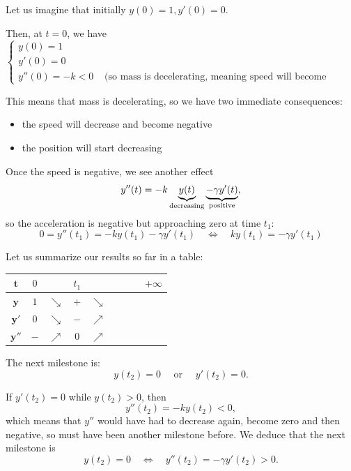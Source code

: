 Let us imagine that initially  \quad $y(0)=1, y'(0)=0$.

Then, at $t=0$, we have
$$
\begin{cases}
y(0)=1 \\
y'(0)=0 \\
y''(0)= -k < 0 & \text{ (so mass is decelerating, meaning speed will become negative)}
\end{cases}
$$

This means that mass is decelerating, so we have two immediate consequences:
\begin{itemize}
	\item the speed will decrease and become negative
	\item the position will start decreasing
\end{itemize}

Once the speed is negative, we see another effect
$$
y''(t) = -k\underbrace{y(t)}_{\text{decreasing}} \underbrace{- \gamma y'(t)}_{\rm positive},
$$
so the acceleration is negative but approaching zero at time $t_1$:
$$
0=y''(t_1) = -ky(t_1) - \gamma y'(t_1)
\quad \Leftrightarrow \quad k y(t_1) = - \gamma y'(t_1)
$$

Let us summarize our results so far in a table:

\begin{graybox}
\begin{center}
\begin{tabular}{c||c|c|c|c|c|c|c|c}
$\pmb{t}$	& $0$ 		& 			& $t_1$ &  			& 			& 	&	& \hspace{1cm} $+\infty$ \\[5pt] \hline\hline
$\pmb{y}$ & $1$	& $ \searrow$	& $+$ &	$\searrow$ 	&	&  \hspace{0.5cm}	&  	& 	\\[5pt] \hline
$\pmb{y'}$ & $0$ &	$\searrow$	& $-$ & $\nearrow$ & 	&  	& &	\\[5pt] \hline
$\pmb{y''}$ & $-$		& $\nearrow$ & 0  & $\nearrow$  & 	& 	&  &	\\[5pt] \hline
\end{tabular}
\end{center}
\end{graybox}

The next milestone is:
$$
y(t_2)=0 \quad \text{ or } \quad y'(t_2)=0.
$$

If $y'(t_2)=0$ while $y(t_2)>0$, then 
$$
y''(t_2) = -ky(t_2) <0,
$$
which means that $y''$ would have had to decrease again, become zero and then negative, so must have been another milestone before.
We deduce that the next milestone is
$$
y(t_2)=0
\quad \Leftrightarrow \quad	
	y''(t_2) = -\gamma y'(t_2) > 0.
$$

